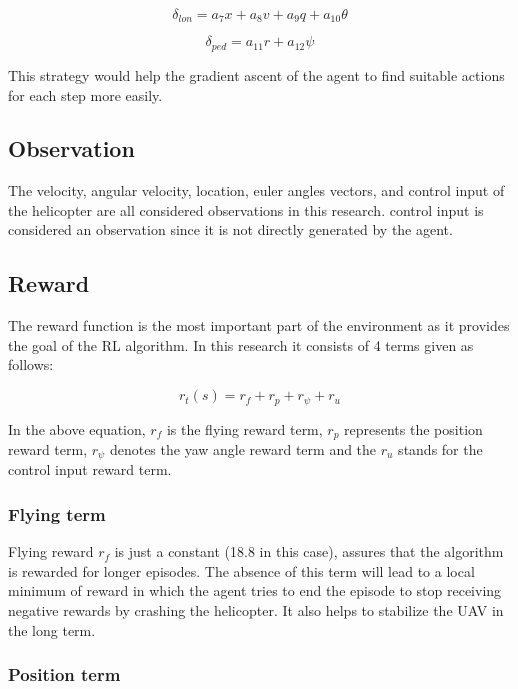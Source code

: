 \begin{equation}
	\delta_{lon} = a_7 x + a_{8} v + a_{9} q + a_{10} \theta 
\end{equation}

\begin{equation}
	\delta_{ped} = a_{11} r + a_{12} \psi 
\end{equation}

This strategy would help the gradient ascent of the agent to find suitable actions for each step more easily.

\subsection{Observation}

The velocity, angular velocity, location, euler angles vectors, and control input of the helicopter are all considered observations in this research. control input is considered an observation since it is not directly generated by the agent.

\subsection{Reward}

The reward function is the most important part of the environment as it provides the goal of the RL algorithm. In this research it consists of 4 terms given as follows:

\begin{equation}
	r_t(s) = r_{f} + r_{p} + r_{\psi}  + r_u
\end{equation}

In the above equation, $r_f$ is the flying reward term, $r_p$ represents the position reward term, $r_\psi$ denotes the yaw angle reward term and the $r_u$ stands for the control input reward term.

\subsubsection{Flying term}

Flying reward $r_{f}$ is just a constant (18.8 in this case), assures that the algorithm is rewarded for longer episodes. The absence of this term will lead to a local minimum of reward in which the agent tries to end the episode to stop receiving negative rewards by crashing the helicopter. It also helps to stabilize the UAV in the long term.

\subsubsection{Position term}

